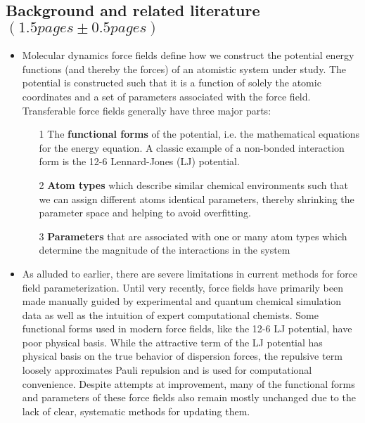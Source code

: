 \documentclass[aps,pre,onecolumn,nofootinbib,superscriptaddress,linenumbers,12pt, draft,tightenlines]{revtex4-1}
\begin{document}
\subsection{Background and related literature $\left(1.5 pages \pm 0.5 pages\right)$}
\begin{itemize}
 \item Molecular dynamics force fields define how we construct the potential energy functions (and thereby the forces) of an atomistic system under study. The potential is constructed such that it is a function of solely the atomic coordinates and a set of parameters associated with the force field. Transferable force fields generally have three major parts: 
  \begin{itemize}
   \item [1] The \textbf{functional forms} of the potential, i.e. the mathematical equations for the energy equation. A classic example of a non-bonded interaction form is the 12-6 Lennard-Jones (LJ) potential.  
   \item [2] \textbf{Atom types} which describe similar chemical environments such that we can assign different atoms identical parameters, thereby shrinking the parameter space and helping to avoid overfitting.
   \item [3] \textbf{Parameters} that are associated with one or many atom types which determine the magnitude of the interactions in the system 
  \end{itemize}
 \item As alluded to earlier, there are severe limitations in current methods for force field parameterization. Until very recently, force fields have primarily been made manually guided by experimental and quantum chemical simulation data as well as the intuition of expert computational chemists.\cite{charmm1,charmm2,mm2,mmff,amber} Some functional forms used in modern force fields, like the 12-6 LJ potential, have poor physical basis. While the attractive term of the LJ potential has physical basis on the true behavior of dispersion forces, the repulsive term loosely approximates Pauli repulsion and is used for computational convenience. Despite attempts at improvement, many of the functional forms and parameters of these force fields also remain mostly unchanged due to the lack of clear, systematic methods for updating them.\cite{unchanged} 

\end{itemize}
\end{document}
